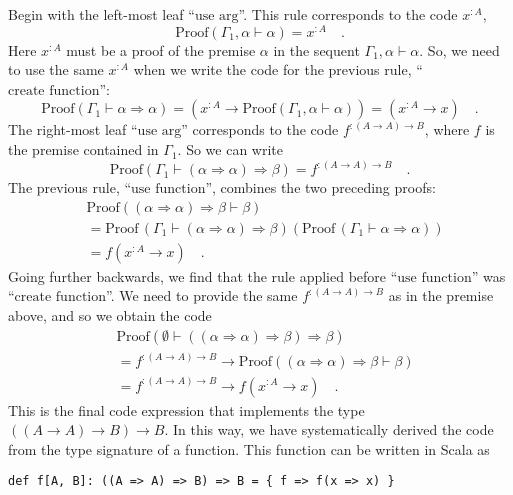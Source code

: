 Begin with the left-most leaf \textsf{``}$\text{use arg}$\textsf{''}. This rule corresponds
to the code $x^{:A}$,
\[
\text{Proof}\left(\Gamma_{1},\alpha\vdash\alpha\right)=x^{:A}\quad.
\]
Here $x^{:A}$ must be a proof of the premise $\alpha$ in the sequent
$\Gamma_{1},\alpha\vdash\alpha$. So, we need to use the same $x^{:A}$
when we write the code for the previous rule, \textsf{``}$\text{create function}$\textsf{''}:
\[
\text{Proof}\left(\Gamma_{1}\vdash\alpha\Rightarrow\alpha\right)=(x^{:A}\rightarrow\text{Proof}\left(\Gamma_{1},\alpha\vdash\alpha\right))=(x^{:A}\rightarrow x)\quad.
\]
The right-most leaf \textsf{``}$\text{use arg}$\textsf{''} corresponds to the code
$f^{:(A\rightarrow A)\rightarrow B}$, where $f$ is the premise contained
in $\Gamma_{1}$. So we can write
\[
\text{Proof}\left(\Gamma_{1}\vdash(\alpha\Rightarrow\alpha)\Rightarrow\beta\right)=f^{:(A\rightarrow A)\rightarrow B}\quad.
\]
The previous rule, \textsf{``}$\text{use function}$\textsf{''}, combines the two
preceding proofs:
\begin{align*}
 & \text{Proof}\left((\alpha\Rightarrow\alpha)\Rightarrow\beta\vdash\beta\right)\\
 & =\text{Proof}\,(\Gamma_{1}\vdash(\alpha\Rightarrow\alpha)\Rightarrow\beta)\left(\text{Proof}\,(\Gamma_{1}\vdash\alpha\Rightarrow\alpha)\right)\\
 & =f(x^{:A}\rightarrow x)\quad.
\end{align*}
Going further backwards, we find that the rule applied before \textsf{``}$\text{use function}$\textsf{''}
was \textsf{``}$\text{create function}$\textsf{''}. We need to provide the same $f^{:\left(A\rightarrow A\right)\rightarrow B}$
as in the premise above, and so we obtain the code
\begin{align*}
 & \text{Proof}\left(\emptyset\vdash((\alpha\Rightarrow\alpha)\Rightarrow\beta)\Rightarrow\beta\right)\\
 & =f^{:\left(A\rightarrow A\right)\rightarrow B}\rightarrow\text{Proof}\left((\alpha\Rightarrow\alpha)\Rightarrow\beta\vdash\beta\right)\\
 & =f^{:\left(A\rightarrow A\right)\rightarrow B}\rightarrow f(x^{:A}\rightarrow x)\quad.
\end{align*}
This is the final code expression that implements the type $((A\rightarrow A)\rightarrow B)\rightarrow B$.
In this way, we have systematically derived the code from the type
signature of a function. This function can be written in Scala as
\begin{lstlisting}
def f[A, B]: ((A => A) => B) => B = { f => f(x => x) }
\end{lstlisting}

